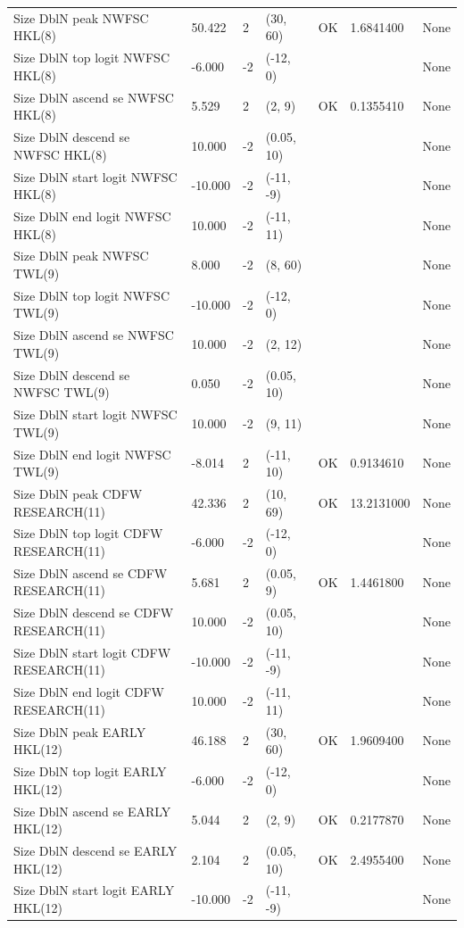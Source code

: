 \documentclass[
  english,
  a4paper,
]{article}
\begin{document}
\begin{landscape}
\begin{longtable}[t]{>{\raggedright\arraybackslash}p{8.5cm}lllll>{\raggedright\arraybackslash}p{4cm}}
Size DblN peak NWFSC HKL(8) & 50.422 & 2 & (30, 60) & OK & 1.6841400 & None\\
Size DblN top logit NWFSC HKL(8) & -6.000 & -2 & (-12, 0) &  &  & None\\
Size DblN ascend se NWFSC HKL(8) & 5.529 & 2 & (2, 9) & OK & 0.1355410 & None\\
Size DblN descend se NWFSC HKL(8) & 10.000 & -2 & (0.05, 10) &  &  & None\\
Size DblN start logit NWFSC HKL(8) & -10.000 & -2 & (-11, -9) &  &  & None\\
Size DblN end logit NWFSC HKL(8) & 10.000 & -2 & (-11, 11) &  &  & None\\
Size DblN peak NWFSC TWL(9) & 8.000 & -2 & (8, 60) &  &  & None\\
Size DblN top logit NWFSC TWL(9) & -10.000 & -2 & (-12, 0) &  &  & None\\
Size DblN ascend se NWFSC TWL(9) & 10.000 & -2 & (2, 12) &  &  & None\\
Size DblN descend se NWFSC TWL(9) & 0.050 & -2 & (0.05, 10) &  &  & None\\
Size DblN start logit NWFSC TWL(9) & 10.000 & -2 & (9, 11) &  &  & None\\
Size DblN end logit NWFSC TWL(9) & -8.014 & 2 & (-11, 10) & OK & 0.9134610 & None\\
Size DblN peak CDFW RESEARCH(11) & 42.336 & 2 & (10, 69) & OK & 13.2131000 & None\\
Size DblN top logit CDFW RESEARCH(11) & -6.000 & -2 & (-12, 0) &  &  & None\\
Size DblN ascend se CDFW RESEARCH(11) & 5.681 & 2 & (0.05, 9) & OK & 1.4461800 & None\\
Size DblN descend se CDFW RESEARCH(11) & 10.000 & -2 & (0.05, 10) &  &  & None\\
Size DblN start logit CDFW RESEARCH(11) & -10.000 & -2 & (-11, -9) &  &  & None\\
Size DblN end logit CDFW RESEARCH(11) & 10.000 & -2 & (-11, 11) &  &  & None\\
Size DblN peak EARLY HKL(12) & 46.188 & 2 & (30, 60) & OK & 1.9609400 & None\\
Size DblN top logit EARLY HKL(12) & -6.000 & -2 & (-12, 0) &  &  & None\\
Size DblN ascend se EARLY HKL(12) & 5.044 & 2 & (2, 9) & OK & 0.2177870 & None\\
Size DblN descend se EARLY HKL(12) & 2.104 & 2 & (0.05, 10) & OK & 2.4955400 & None\\
Size DblN start logit EARLY HKL(12) & -10.000 & -2 & (-11, -9) &  &  & None\\

\end{longtable}
\end{landscape}
\end{document}
